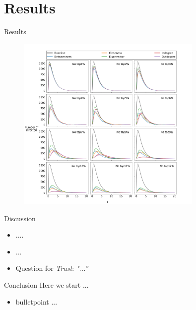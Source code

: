 \documentclass[10pt]{beamer}
\begin{document}
\section{Results}

\begin{frame}{Results}
\begin{figure}
\begin{center}
    \includegraphics[width=0.8\textwidth]{Figures/epidemic_course.pdf}
\end{center}
\end{figure}
\end{frame}

\begin{frame}{Discussion}
 \begin{itemize}
    \item ....
    \item ...
    \item Question for \textit{Trust}: \textit{"...”}
 \end{itemize}
\end{frame}

\begin{frame}{Conclusion}
 Here we start ...
 \begin{itemize}
     \item bulletpoint ...
 \end{itemize}
\end{frame}
\end{document}
